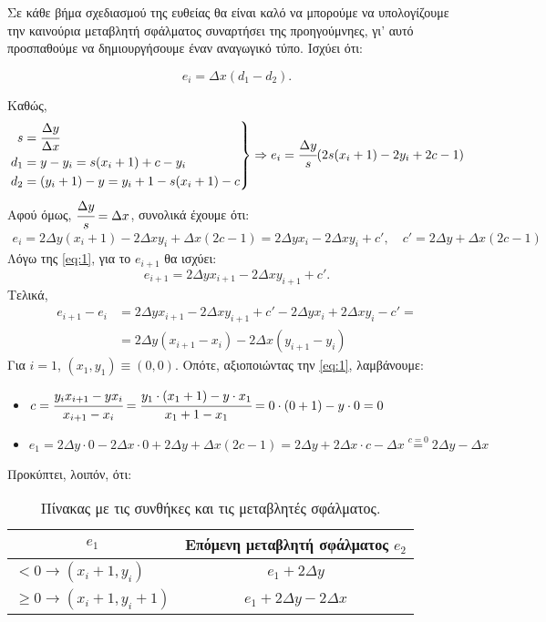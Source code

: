 Σε κάθε βήμα σχεδιασμού της ευθείας θα είναι καλό να μπορούμε να υπολογίζουμε την καινούρια μεταβλητή σφάλματος συναρτήσει της προηγούμνηες, γι' αυτό προσπαθούμε να δημιουργήσουμε έναν αναγωγικό τύπο. Ισχύει ότι:

\begin{equation*}
	e_i = \Delta x(d_1-d_2).	
\end{equation*}

%
Καθώς,
%
\begin{equation*}
	  \left.\begin{aligned}
	  s &= \cfrac{\Delta y}{\Delta x}	\\
	  d_1 &= y-y_i = s(x_i+1)+c-y_i\\
	  d_2 &= (y_i+1)-y = y_i+1- s(x_i+1)-c	
	\end{aligned}\right\} \Rightarrow e_i = \cfrac{\Delta y}{s} (2s(x_i+1)-2y_i+2c-1)
\end{equation*}
 Αφού όμως, $\cfrac{\Delta y}{s} = \Delta x$, συνολικά έχουμε ότι:
\begin{align*}
	e_i = 2\Delta y(x_i+1) - 2\Delta xy_i + \Delta x(2c − 1) 
		= 2\Delta yx_i - 2\Delta xy_i +c', \quad c' = 2\Delta y + \Delta x(2c − 1) \tag{1}
 	\label{eq:1}
\end{align*}
%
Λόγω της \eqref{eq:1}, για το $e_{i+1}$ θα ισχύει: 
%
\begin{equation*}
	e_{i+1} = 2\Delta yx_{i+1} − 2\Delta xy_{i+1} + c'.
\end{equation*}
%
Τελικά,
%
\begin{align*}
	e_{i+1}-e_i &= 2\Delta yx_{i+1} − 2\Delta xy_{i+1} + c'- 2\Delta yx_i + 2\Delta xy_i -c' = \\\
				&= 2\Delta y (x_{i+1}-x_i)-2\Delta x(y_{i+1}-y_i)		
\end{align*}
%
Για $i=1$, $(x_1,y_1) \equiv (0,0)$. Οπότε, αξιοποιώντας την \eqref{eq:1}, λαμβάνουμε:

\begin{itemize}
	\item $c = \cfrac{y_i x_{i+1} - y x_i}{x_{i+1}-x_i} 
  =	\cfrac{y_1 \cdot(x_1+1) - y \cdot x_1}{x_1+1-x_1}
  = 0 \cdot(0+1) - y \cdot 0
  = 0 $
	\item $e_1 = 2\Delta y \cdot 0 - 2\Delta x\cdot 0 +2\Delta y + \Delta x (2c-1) 
	= 2\Delta y + 2\Delta x \cdot c - \Delta x \overset{c=0}{=} 2\Delta y - \Delta x$
\end{itemize}
%
Προκύπτει, λοιπόν, ότι:
%
\begin{table}[h!]
\centering
\begin{tabular}{l c}
\toprule
\multicolumn{1}{c}{$e_1$} & \multicolumn{1}{c}{Επόμενη μεταβλητή σφάλματος $e_2$} \\
\midrule
$< 0 \to (x_i+1, y_i)$       & $e_1 + 2\Delta y$                  \\
$\geq 0 \to (x_i+1, y_i+1)$  & $e_1 + 2\Delta y - 2\Delta x$      \\
\bottomrule
\end{tabular}
\caption{Πίνακας με τις συνθήκες και τις μεταβλητές σφάλματος.}
\label{tab:error_conditions}
\end{table}


